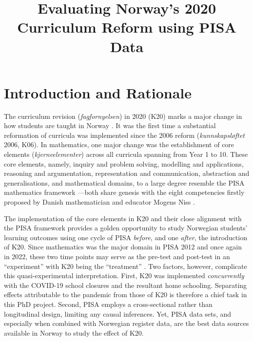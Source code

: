 \documentclass[
    a4paper,                %
    11pt,                   %
    stu,                    %
    donotrepeattitle,       %
    floatsintext,           %
    biblatex,               %
    colorlinks=true,        %
    linkcolor=red,          %
    anchorcolor=black,      %
    citecolor=blue,         %
    urlcolor=blue,          %
    bookmarks=true,         %
    bookmarksopen=false,    %
    bookmarksnumbered=true, %
    dvipsnames              %
]{apa7}
\title{Evaluating Norway's 2020 Curriculum Reform using PISA Data}
\begin{document}
\setcounter{page}{0}
\maketitle


\section{Introduction and Rationale}

The curriculum revision (\textit{fagfornyelsen}) in 2020 (K20) marks a major change in how students are taught in Norway \parencite{udir:2020}. It was the first time a substantial reformation of curricula was implemented since the 2006 reform (\textit{kunnskapsl{\o}ftet} 2006, K06). In mathematics, one major change was the establishment of core elements (\textit{kjerneelementer}) across all curricula spanning from Year 1 to 10. These core elements, namely, inquiry and problem solving, modelling and applications, reasoning and argumentation, representation and communication, abstraction and generalisations, and mathematical domains, to a large degree resemble the PISA mathematics framework \parencite{oecd:2018}---both share genesis with the eight competencies firstly proposed by Danish mathematician and educator Mogens Niss \parencite{niss:2003,niss:2011,niss:2019}.

The implementation of the core elements in K20 and their close alignment with the PISA framework provides a golden opportunity to study Norwegian students' learning outcomes using one cycle of PISA \emph{before}, and one \emph{after}, the introduction of K20. Since mathematics was the major domain in PISA 2012 and once again in 2022, these two time points may serve as the pre-test and post-test in an ``experiment'' with K20 being the ``treatment'' \parencite{shadish:2002}. Two factors, however, complicate this quasi-experimental interpretation. First, K20 was implemented \emph{concurrently} with the COVID-19 school closures and the resultant home schooling. Separating effects attributable to the pandemic from those of K20 is therefore a chief task in this PhD project. Second, PISA employs a cross-sectional rather than longitudinal design, limiting any causal inferences. Yet, PISA data sets, and especially when combined with Norwegian register data, are the best data sources available in Norway to study the effect of K20.
\end{document}
